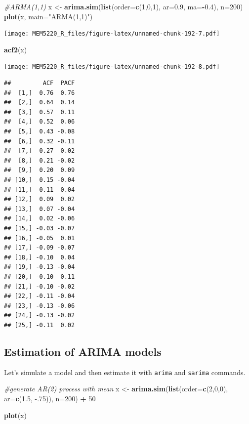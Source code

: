\documentclass[]{book}
\newenvironment{Shaded}{\begin{snugshade}}{\end{snugshade}}
\newcommand{\CommentTok}[1]{\textcolor[rgb]{0.56,0.35,0.01}{\textit{#1}}}
\newcommand{\DataTypeTok}[1]{\textcolor[rgb]{0.13,0.29,0.53}{#1}}
\newcommand{\DecValTok}[1]{\textcolor[rgb]{0.00,0.00,0.81}{#1}}
\newcommand{\FloatTok}[1]{\textcolor[rgb]{0.00,0.00,0.81}{#1}}
\newcommand{\KeywordTok}[1]{\textcolor[rgb]{0.13,0.29,0.53}{\textbf{#1}}}
\newcommand{\NormalTok}[1]{#1}
\newcommand{\OperatorTok}[1]{\textcolor[rgb]{0.81,0.36,0.00}{\textbf{#1}}}
\newcommand{\StringTok}[1]{\textcolor[rgb]{0.31,0.60,0.02}{#1}}
\begin{document}
\begin{Shaded}
\begin{Highlighting}[]
\CommentTok{#ARMA(1,1)}
\NormalTok{x <-}\StringTok{ }\KeywordTok{arima.sim}\NormalTok{(}\KeywordTok{list}\NormalTok{(}\DataTypeTok{order=}\KeywordTok{c}\NormalTok{(}\DecValTok{1}\NormalTok{,}\DecValTok{0}\NormalTok{,}\DecValTok{1}\NormalTok{), }\DataTypeTok{ar=}\FloatTok{0.9}\NormalTok{, }\DataTypeTok{ma=}\OperatorTok{-}\FloatTok{0.4}\NormalTok{), }\DataTypeTok{n=}\DecValTok{200}\NormalTok{)}
\KeywordTok{plot}\NormalTok{(x, }\DataTypeTok{main=}\StringTok{"ARMA(1,1)"}\NormalTok{) }
\end{Highlighting}
\end{Shaded}

\texttt{[image: MEM5220\_R\_files/figure-latex/unnamed-chunk-192-7.pdf]}

\begin{Shaded}
\begin{Highlighting}[]
\KeywordTok{acf2}\NormalTok{(x)}
\end{Highlighting}
\end{Shaded}

\texttt{[image: MEM5220\_R\_files/figure-latex/unnamed-chunk-192-8.pdf]}

\begin{verbatim}
##         ACF  PACF
##  [1,]  0.76  0.76
##  [2,]  0.64  0.14
##  [3,]  0.57  0.11
##  [4,]  0.52  0.06
##  [5,]  0.43 -0.08
##  [6,]  0.32 -0.11
##  [7,]  0.27  0.02
##  [8,]  0.21 -0.02
##  [9,]  0.20  0.09
## [10,]  0.15 -0.04
## [11,]  0.11 -0.04
## [12,]  0.09  0.02
## [13,]  0.07 -0.04
## [14,]  0.02 -0.06
## [15,] -0.03 -0.07
## [16,] -0.05  0.01
## [17,] -0.09 -0.07
## [18,] -0.10  0.04
## [19,] -0.13 -0.04
## [20,] -0.10  0.11
## [21,] -0.10 -0.02
## [22,] -0.11 -0.04
## [23,] -0.13 -0.06
## [24,] -0.13 -0.02
## [25,] -0.11  0.02
\end{verbatim}

\hypertarget{estimation-of-arima-models}{%
\subsection{Estimation of ARIMA models}\label{estimation-of-arima-models}}

Let's simulate a model and then estimate it with \texttt{arima} and \texttt{sarima} commands.

\begin{Shaded}
\begin{Highlighting}[]
\CommentTok{#generate AR(2) process with mean}
\NormalTok{x <-}\StringTok{ }\KeywordTok{arima.sim}\NormalTok{(}\KeywordTok{list}\NormalTok{(}\DataTypeTok{order=}\KeywordTok{c}\NormalTok{(}\DecValTok{2}\NormalTok{,}\DecValTok{0}\NormalTok{,}\DecValTok{0}\NormalTok{), }
                    \DataTypeTok{ar=}\KeywordTok{c}\NormalTok{(}\FloatTok{1.5}\NormalTok{, }\FloatTok{-.75}\NormalTok{)), }
               \DataTypeTok{n=}\DecValTok{200}\NormalTok{) }\OperatorTok{+}\StringTok{ }\DecValTok{50}


\KeywordTok{plot}\NormalTok{(x) }
\end{Highlighting}
\end{Shaded}
\end{document}

